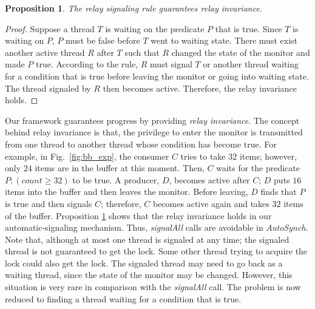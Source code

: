 \documentclass{sigplanconf}
\newtheorem{proposition}{Proposition}
\begin{document}
\begin{proposition} \label{pro:relay_signal}
     The relay signaling rule guarantees relay invariance. 
\end{proposition}
\begin{proof}
    Suppose a thread $T$ is waiting on the predicate $P$ that is true. Since 
    $T$ is waiting 
    on $P$, $P$ must be false before $T$ went to waiting state. There must 
    exist another active thread $R$ after $T$ such that $R$ changed the state 
    of the monitor and made  $P$ true. According to the rule, $R$ must signal
    $T$ or another thread waiting for a condition that is true before leaving the
    monitor or going into waiting state. The thread signaled by $R$ then
    becomes active. Therefore, the relay invariance holds. 
 
 \end{proof}

 Our framework guarantees progress by providing {\em relay
 invariance}. 
The concept behind relay invariance is that, the privilege to enter the monitor
is transmitted from one thread to another thread whose condition has become true. 
For example, in Fig.~\ref{fig:bb_exp}, the consumer $C$ tries to take
$32$ items; however, only $24$ items are in the buffer at this moment. Then, $C$
waits for the predicate $P:  (count \ge 32)$ to be true. A producer, $D$, becomes 
active after 
$C$; $D$ puts $16$ items into the buffer and then leaves the monitor. Before 
leaving, $D$ finds that $P$ is true and then signals $C$; therefore, $C$ 
becomes active again and takes $32$ items of the buffer.
Proposition \ref{pro:relay_signal} shows that the relay
invariance holds in our automatic-signaling mechanism. 
Thus, {\em signalAll} calls are avoidable in {\em AutoSynch}. Note that,
although at most one thread is signaled at any time; the
signaled thread is not guaranteed to get the lock. Some other
thread trying to acquire the lock could also get the lock. The signaled thread
may need to go back as a waiting thread, since the state of the monitor may be
changed. However, this situation is very rare in comparison with the {\em
signalAll} call. The problem is now reduced to finding a thread waiting for a 
condition that is 
true. 
\end{document}
